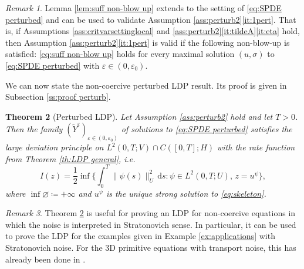 \documentclass{amsart}
\newcommand{\dd}{\,\mathrm{d}}
\newcommand{\<}{\langle}
\newcommand{\?}{\rangle}
\theoremstyle{plain}
\newtheorem{theorem}{Theorem}[section]
\theoremstyle{remark}
\newtheorem{remark}[theorem]{Remark}
\theoremstyle{plain}
\numberwithin{equation}{section}
\newcommand{\eps}{\varepsilon}
\begin{document}
\begin{remark}
  Lemma \ref{lem:suff non-blow up} extends to the setting of \eqref{eq:SPDE perturbed} and can be used to validate Assumption \ref{ass:perturb2}\ref{it:1pert}. That is, if Assumptions  \ref{ass:critvarsettinglocal} and \ref{ass:perturb2}\ref{it:tildeA}\ref{it:eta} hold, then Assumption \ref{ass:perturb2}\ref{it:1pert} is valid if the following non-blow-up is satisfied: 
  \hspace{0.05em}  
   \eqref{eq:suff non-blow up} holds for every maximal solution $(u,\sigma)$ to \eqref{eq:SPDE perturbed} with $\eps\in(0,\eps_0)$.  
\end{remark}


We can now state the non-coercive perturbed LDP result. Its proof is given in Subsection \ref{ss:proof perturb}.
 
 
\begin{theorem}[Perturbed LDP]\label{th:LDP perturbed2}  
    Let Assumption \ref{ass:perturb2} hold and let $T>0$.  
    Then the family $(\tilde{Y}^\eps)_{\eps\in(0,\eps_0)}$ of solutions to \eqref{eq:SPDE perturbed} satisfies the large deviation principle on $L^2(0,T;V)\cap C([0,T];H)$ with  the  rate function from Theorem \ref{th:LDP general}, i.e.\   
\begin{equation*} 
I(z)=\frac{1}{2}\inf\Big\{\textstyle{\int_0^T}\|\psi(s)\|_U^2\dd s : \psi\in L^2(0,T;U), \, z=u^{\psi}\Big\},
\end{equation*}
where $\inf\varnothing\coloneqq +\infty$ and $u^\psi$ is the unique strong solution to \eqref{eq:skeleton}. 
\end{theorem} 



\begin{remark}\label{rem:appl strat}
Theorem \ref{th:LDP perturbed2} is useful for proving an LDP for non-coercive equations in which the noise is interpreted in Stratonovich sense. In particular, it can be used to prove the LDP for the examples given in Example \ref{ex:applications} with Stratonovich noise. For the  3D primitive equations  with transport noise, this has already been done in \cite[Th.\ 2.9]{AT25}.
\end{remark}
\end{document}

